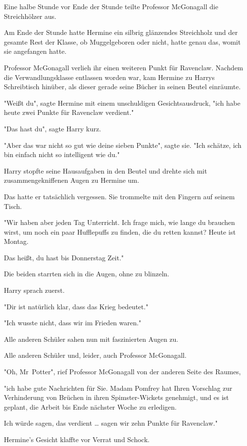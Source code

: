 {Eine halbe Stunde vor Ende der Stunde teilte Professor McGonagall die Streichhölzer aus.

Am Ende der Stunde hatte Hermine ein silbrig glänzendes Streichholz und der gesamte Rest der Klasse, ob Muggelgeboren oder nicht, hatte genau das, womit sie angefangen hatte.

Professor McGonagall verlieh ihr einen weiteren Punkt für Ravenclaw. Nachdem die Verwandlungsklasse entlassen worden war, kam Hermine zu Harrys Schreibtisch hinüber, als dieser gerade seine Bücher in seinen Beutel einräumte.

"Weißt du", sagte Hermine mit einem unschuldigen Gesichtsausdruck, "ich habe heute zwei Punkte für Ravenclaw verdient."

"Das hast du", sagte Harry kurz.

"Aber das war nicht so gut wie deine sieben Punkte", sagte sie. "Ich schätze, ich bin einfach nicht so intelligent wie du."

Harry stopfte seine Hausaufgaben in den Beutel und drehte sich mit zusammengekniffenen Augen zu Hermine um.

Das hatte er tatsächlich vergessen. Sie trommelte mit den Fingern auf seinem Tisch.

"Wir haben aber jeden Tag Unterricht. Ich frage mich, wie lange du brauchen wirst, um noch ein paar Hufflepuffs zu finden, die du retten kannst? Heute ist Montag.

Das heißt, du hast bis Donnerstag Zeit."

Die beiden starrten sich in die Augen, ohne zu blinzeln.

Harry sprach zuerst.

"Dir ist natürlich klar, dass das Krieg bedeutet."

"Ich wusste nicht, dass wir im Frieden waren."

Alle anderen Schüler sahen nun mit faszinierten Augen zu.

Alle anderen Schüler und, leider, auch Professor McGonagall.

"Oh, Mr~Potter", rief Professor McGonagall von der anderen Seite des Raumes,

"ich habe gute Nachrichten für Sie. Madam Pomfrey hat Ihren Vorschlag zur Verhinderung von Brüchen in ihren Spimster-Wickets genehmigt, und es ist geplant, die Arbeit bis Ende nächster Woche zu erledigen.

Ich würde sagen, das verdient … sagen wir zehn Punkte für Ravenclaw."

Hermine's Gesicht klaffte vor Verrat und Schock.

}
